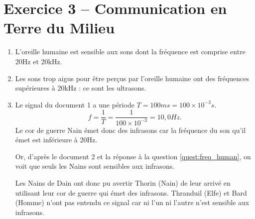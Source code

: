 \documentclass[12pt,a4paper,fleqn]{article}
\begin{document}
\section*{Exercice 3 -- Communication en Terre du Milieu}

\begin{enumerate}
\item L'oreille humaine est sensible aux sons dont la fréquence est comprise entre \unit{20}{Hz} et \unit{20}{kHz}.
\label{quest:freq_human}

\item Les sons trop aigus pour être perçus par l'oreille humaine ont des fréquences supérieures à \unit{20}{kHz} : ce sont les ultrasons.

\item
Le signal du document 1 a une période $ T = \unit{100}{ms} = \unit{100\times10^{-3}}{s}$.
\[
f = \frac{1}{T} = \frac{1}{100\times10^{-3}} = \unit{10{,}0}{Hz}.
\]
Le cor de guerre Nain émet donc des infrasons car la fréquence du son qu'il émet est inférieure à \unit{20}{Hz}.

Or, d'après le document 2 et la réponse à la question \ref{quest:freq_human}, on voit que seuls les Nains sont sensibles aux infrasons.

Les Nains de Dain ont donc pu avertir Thorin (Nain) de leur arrivé en utilisant leur cor de guerre qui émet des infrasons.
Thranduil (Elfe) et Bard (Homme) n'ont pas entendu ce signal car ni l'un ni l'autre n'est sensible aux infrasons.




\end{enumerate}
\end{document}
